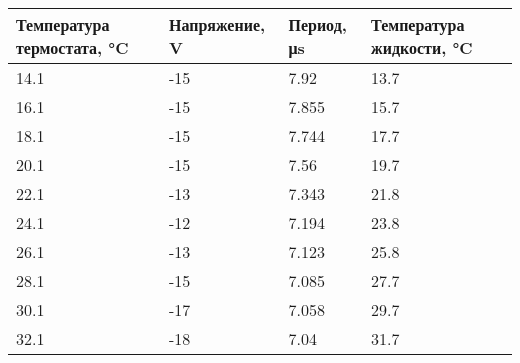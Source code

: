 \documentclass[a4paper]{article}
\begin{document}
\begin{table}[]
	\centering
	\label{tab}
	\begin{tabular}{|l|l|l|l|}
		\hline
		\textbf{Температура термостата, \si{\degreeCelsius}} & \textbf{Напряжение, \si{\volt}} & \textbf{Период, \si{\micro \second}} & \textbf{Температура жидкости, \si{\degreeCelsius}} \\ \hline
		14.1                                                 & -15                                          & 7.92                                 & 13.7                                               \\ \hline
		16.1                                                 & -15                                          & 7.855                                & 15.7                                               \\ \hline
		18.1                                                 & -15                                          & 7.744                                & 17.7                                               \\ \hline
		20.1                                                 & -15                                          & 7.56                                 & 19.7                                               \\ \hline
		22.1                                                 & -13                                          & 7.343                                & 21.8                                               \\ \hline
		24.1                                                 & -12                                          & 7.194                                & 23.8                                               \\ \hline
		26.1                                                 & -13                                          & 7.123                                & 25.8                                               \\ \hline
		28.1                                                 & -15                                          & 7.085                                & 27.7                                               \\ \hline
		30.1                                                 & -17                                          & 7.058                                & 29.7                                               \\ \hline
		32.1                                                 & -18                                          & 7.04                                 & 31.7                                               \\ \hline

\end{tabular}
\end{table}
\end{document}
